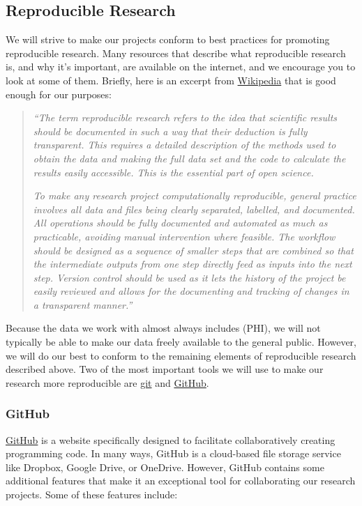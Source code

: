 \documentclass[
  letterpaper,
  DIV=11,
  numbers=noendperiod]{scrreprt}
\begin{document}
\subsection{Reproducible Research}\label{reproducible-research}

We will strive to make our projects conform to best practices for
promoting reproducible research. Many resources that describe what
reproducible research is, and why it's important, are available on the
internet, and we encourage you to look at some of them. Briefly, here is
an excerpt from
\href{https://en.wikipedia.org/wiki/Reproducibility}{Wikipedia} that is
good enough for our purposes:

\begin{quote}
\emph{``The term reproducible research refers to the idea that
scientific results should be documented in such a way that their
deduction is fully transparent. This requires a detailed description of
the methods used to obtain the data and making the full data set and the
code to calculate the results easily accessible. This is the essential
part of open science.}

\emph{To make any research project computationally reproducible, general
practice involves all data and files being clearly separated, labelled,
and documented. All operations should be fully documented and automated
as much as practicable, avoiding manual intervention where feasible. The
workflow should be designed as a sequence of smaller steps that are
combined so that the intermediate outputs from one step directly feed as
inputs into the next step. Version control should be used as it lets the
history of the project be easily reviewed and allows for the documenting
and tracking of changes in a transparent manner.''}
\end{quote}

Because the data we work with almost always includes (PHI), we will not
typically be able to make our data freely available to the general
public. However, we will do our best to conform to the remaining
elements of reproducible research described above. Two of the most
important tools we will use to make our research more reproducible are
\href{https://git-scm.com/}{git} and \href{https://github.com/}{GitHub}.

\subsubsection{GitHub}\label{github}

\href{https://github.com/}{GitHub} is a website specifically designed to
facilitate collaboratively creating programming code. In many ways,
GitHub is a cloud-based file storage service like Dropbox, Google Drive,
or OneDrive. However, GitHub contains some additional features that make
it an exceptional tool for collaborating our research projects. Some of
these features include:
\end{document}
